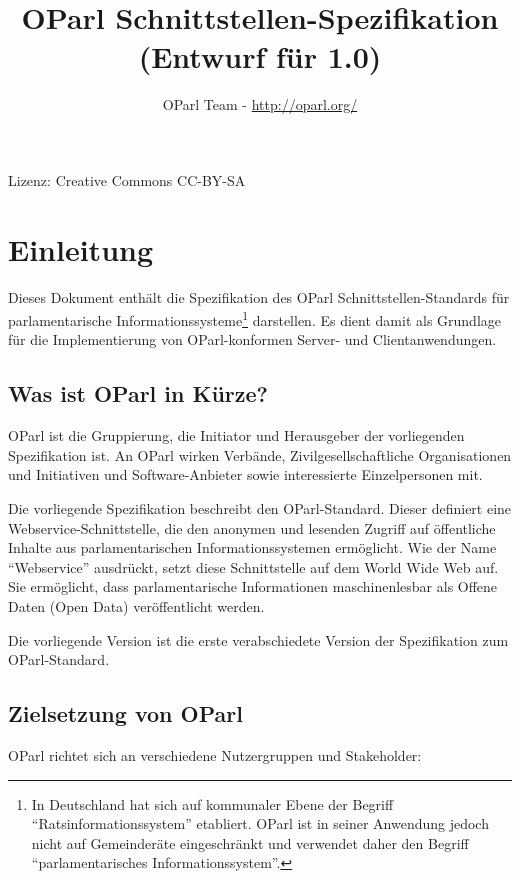 \documentclass[,a4paper]{article}
\title{OParl Schnittstellen-Spezifikation (Entwurf für 1.0)}
\author{OParl Team - \url{http://oparl.org/}}
\date{}
\begin{document}
\maketitle

Lizenz: Creative Commons CC-BY-SA

\section{Einleitung}\label{einleitung}

Dieses Dokument enthält die Spezifikation des OParl
Schnittstellen-Standards für parlamentarische
Informationssysteme\footnote{In Deutschland hat sich auf kommunaler
  Ebene der Begriff ``Ratsinformationssystem'' etabliert. OParl ist in
  seiner Anwendung jedoch nicht auf Gemeinderäte eingeschränkt und
  verwendet daher den Begriff ``parlamentarisches Informationssystem''.}
darstellen. Es dient damit als Grundlage für die Implementierung von
OParl-konformen Server- und Clientanwendungen.

\subsection{Was ist OParl in Kürze?}\label{was-ist-oparl-in-kuxfcrze}

OParl ist die Gruppierung, die Initiator und Herausgeber der
vorliegenden Spezifikation ist. An OParl wirken Verbände,
Zivilgesellschaftliche Organisationen und Initiativen und
Software-Anbieter sowie interessierte Einzelpersonen mit.

Die vorliegende Spezifikation beschreibt den OParl-Standard. Dieser
definiert eine Webservice-Schnittstelle, die den anonymen und lesenden
Zugriff auf öffentliche Inhalte aus parlamentarischen
Informationssystemen ermöglicht. Wie der Name ``Webservice'' ausdrückt,
setzt diese Schnittstelle auf dem World Wide Web auf. Sie ermöglicht,
dass parlamentarische Informationen maschinenlesbar als Offene Daten
(Open Data) veröffentlicht werden.

Die vorliegende Version ist die erste verabschiedete Version der
Spezifikation zum OParl-Standard.

\subsection{Zielsetzung von OParl}\label{zielsetzung-von-oparl}

OParl richtet sich an verschiedene Nutzergruppen und Stakeholder:
\end{document}
